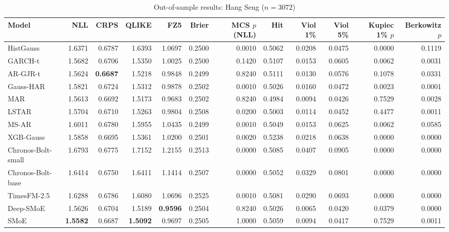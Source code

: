 \begin{table}[!htbp]\centering\scriptsize
\caption{Out-of-sample results: Hang Seng ($n=3072$)}\label{tab:asset_hsi}
\begin{adjustbox}{max width=\textwidth}
\begin{tabular}{lrrrrrrrrrrr}
\toprule
Model & NLL & CRPS & QLIKE & FZ5 & Brier & MCS $p$ (NLL) & Hit & Viol 1\% & Viol 5\% & Kupiec 1\% $p$ & Berkowitz $p$\\
\midrule
HistGauss & 1.6371 & 0.6787 & 1.6393 & 1.0697 & 0.2500 & 0.0010 & 0.5062 & 0.0208 & 0.0475 & 0.0000 & 0.1119\\
GARCH-t & 1.5682 & 0.6706 & 1.5350 & 1.0025 & 0.2500 & 0.1420 & 0.5107 & 0.0153 & 0.0605 & 0.0062 & 0.0031\\
AR-GJR-t & 1.5624 & \textbf{0.6687} & 1.5218 & 0.9848 & 0.2499 & 0.8240 & 0.5111 & 0.0130 & 0.0576 & 0.1078 & 0.0331\\
Gauss-HAR & 1.5821 & 0.6724 & 1.5312 & 0.9878 & 0.2502 & 0.0010 & 0.5026 & 0.0160 & 0.0472 & 0.0023 & 0.0001\\
MAR & 1.5613 & 0.6692 & 1.5173 & 0.9683 & 0.2502 & 0.8240 & 0.4984 & 0.0094 & 0.0426 & 0.7529 & 0.0028\\
LSTAR & 1.5704 & 0.6710 & 1.5263 & 0.9804 & 0.2508 & 0.0200 & 0.5003 & 0.0114 & 0.0452 & 0.4477 & 0.0011\\
MS-AR & 1.6011 & 0.6780 & 1.5955 & 1.0435 & 0.2499 & 0.0010 & 0.5049 & 0.0153 & 0.0625 & 0.0062 & 0.0585\\
XGB-Gauss & 1.5858 & 0.6695 & 1.5361 & 1.0200 & 0.2501 & 0.0020 & 0.5238 & 0.0218 & 0.0638 & 0.0000 & 0.0000\\
Chronos-Bolt-small & 1.6793 & 0.6775 & 1.7152 & 1.2155 & 0.2513 & 0.0000 & 0.5085 & 0.0407 & 0.0905 & 0.0000 & 0.0000\\
Chronos-Bolt-base & 1.6414 & 0.6750 & 1.6411 & 1.1414 & 0.2507 & 0.0000 & 0.5052 & 0.0329 & 0.0801 & 0.0000 & 0.0000\\
TimesFM-2.5 & 1.6288 & 0.6786 & 1.6080 & 1.0696 & 0.2525 & 0.0010 & 0.5081 & 0.0290 & 0.0693 & 0.0000 & 0.0000\\
Deep-SMoE & 1.5626 & 0.6704 & 1.5189 & \textbf{0.9596} & 0.2504 & 0.8240 & 0.5026 & 0.0065 & 0.0420 & 0.0379 & 0.0000\\
SMoE & \textbf{1.5582} & 0.6687 & \textbf{1.5092} & 0.9697 & 0.2505 & 1.0000 & 0.5059 & 0.0094 & 0.0417 & 0.7529 & 0.0011\\
\bottomrule
\end{tabular}
\end{adjustbox}
\end{table}